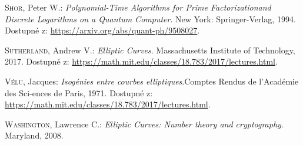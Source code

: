 \documentclass [12pt]{report}
\begin{document}
\begin{thebibliography}{97}
\textsc{Shor}, Peter W.: \textit{Polynomial-Time Algorithms for Prime Factorizationand Discrete Logarithms on a Quantum Computer}. New York: Springer-Verlag, 1994. Dostupné z: \url{https://arxiv.org/abs/quant-ph/9508027}.

\textsc{Sutherland}, Andrew V.: \textit{Elliptic Curves}. Massachusetts Institute of Technology, 2017. Dostupné z: \url{https://math.mit.edu/classes/18.783/2017/lectures.html}. 

\textsc{Vélu}, Jacques: \textit{Isogénies entre courbes elliptiques}.Comptes Rendus de l’Académie des Sci-ences de Paris, 1971. Dostupné z: \url{https://math.mit.edu/classes/18.783/2017/lectures.html}. 


\textsc{Washington}, Lawrence C.: \textit{Elliptic Curves: Number theory and cryptography}. Maryland, 2008. 

\end{thebibliography}
\end{document}

